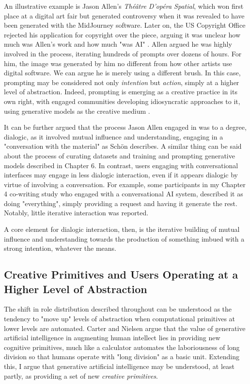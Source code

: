 An illustrative example is Jason Allen's \textit{Théâtre D'opéra Spatial}, which won first place at a digital art fair but generated controversy when it was revealed to have been generated with the MidJourney software. Later on, the US Copyright Office rejected his application for copyright over the piece, arguing it was unclear how much was Allen's work and how much "was AI" \cite{US-Copyright-Office-Review-Board2023-nw}. Allen argued he was highly involved in the process, iterating hundreds of prompts over dozens of hours. For him, the image was generated by him no different from how other artists use digital software. We can argue he is merely using a different brush. In this case, prompting may be considered not only \textit{intention} but \textit{action}, simply at a higher level of abstraction.  Indeed, prompting is emerging as a creative practice in its own right, with engaged communities developing idiosyncratic approaches to it, using generative models as the creative medium \cite{Chang2023-tv, Smith2022-dm}.

It can be further argued that the process Jason Allen engaged in was to a degree, dialogic, as it involved mutual influence and understanding, engaging in a "conversation with the material" as Schön describes. A similar thing can be said about the process of curating datasets and training and prompting generative models described in Chapter 6. In contrast, users engaging with conversational interfaces may engage in less dialogic interaction, even if it appears dialogic by virtue of involving a conversation. For example, some participants in my Chapter 4 co-writing study who engaged with a conversational AI system, described it as doing "everything", simply providing a request and having it generate the rest. Notably, little iterative interaction was reported. 

A core element for dialogic interaction, then, is the iterative building of mutual influence and understanding towards the production of something imbued with a strong intention, whatever the means. 

\subsection{Creative Primitives and Users Operating at a Higher Level of Abstraction}

The shift in role distribution described throughout can be understood as the tendency to "move up" levels of abstraction when computational primitives at lower levels are automated. Carter and Nielsen \cite{Carter2017-xj} argue that the value of generative artificial intelligence in augmenting human intellect lies in providing new cognitive primitives, much like a calculator automates the laboriousness of long division so that humans operate with "long division" as a basic unit. Extending this, I argue that generative artificial intelligence may be understood, at least partly, as providing a set of new \textit{creative primitives}.

